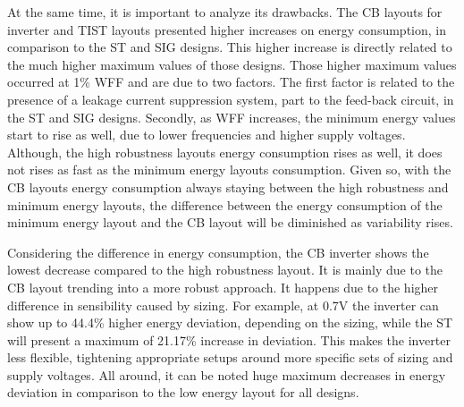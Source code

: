 \documentclass[pgmicro,mestrado,english]{iiufrgs}
\begin{document}
    At the same time, it is important to analyze its drawbacks. The CB layouts for inverter and TIST layouts presented higher increases on energy consumption, in comparison to the ST and SIG designs. This higher increase is directly related to the much higher maximum values of those designs. Those higher maximum values occurred at 1\% WFF and are due to two factors. The first factor is related to the presence of a leakage current suppression system, part to the feed-back circuit, in the ST and SIG designs. Secondly, as WFF increases, the minimum energy values start to rise as well, due to lower frequencies and higher supply voltages. Although, the high robustness layouts energy consumption rises as well, it does not rises as fast as the minimum energy layouts consumption. Given so, with the CB layouts energy consumption always staying between the high robustness and minimum energy layouts, the difference between the energy consumption of the minimum energy layout and the CB layout will be diminished as variability rises.

    Considering the difference in energy consumption, the CB inverter shows the lowest decrease compared to the high robustness layout. It is mainly due to the CB layout trending into a more robust approach. It happens due to the higher difference in sensibility caused by sizing. For example, at 0.7V the inverter can show up to 44.4\% higher energy deviation, depending on the sizing, while the ST will present a maximum of 21.17\% increase in deviation. This makes the inverter less flexible, tightening appropriate setups around more specific sets of sizing and supply voltages. All around, it can be noted huge maximum decreases in energy deviation in comparison to the low energy layout for all designs.
\end{document}
